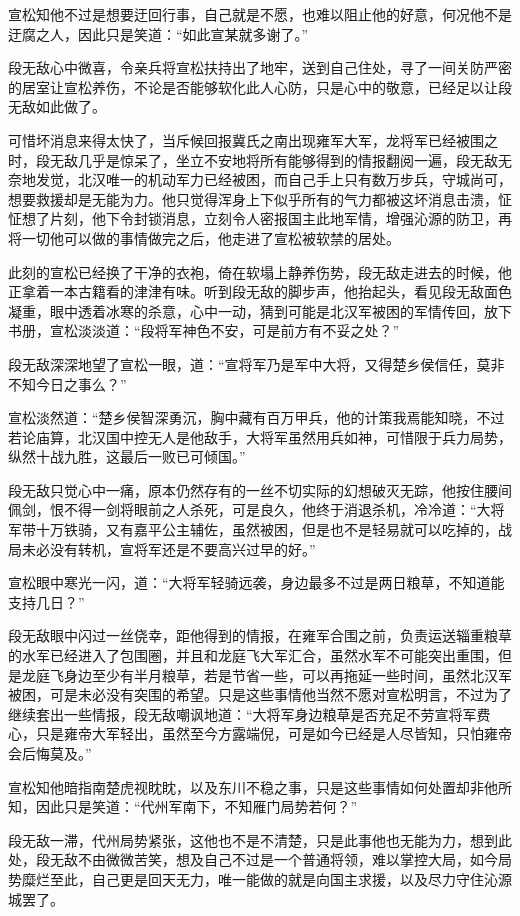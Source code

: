 宣松知他不过是想要迂回行事，自己就是不愿，也难以阻止他的好意，何况他不是迂腐之人，因此只是笑道：“如此宣某就多谢了。”

段无敌心中微喜，令亲兵将宣松扶持出了地牢，送到自己住处，寻了一间关防严密的居室让宣松养伤，不论是否能够软化此人心防，只是心中的敬意，已经足以让段无敌如此做了。

可惜坏消息来得太快了，当斥候回报冀氏之南出现雍军大军，龙将军已经被围之时，段无敌几乎是惊呆了，坐立不安地将所有能够得到的情报翻阅一遍，段无敌无奈地发觉，北汉唯一的机动军力已经被困，而自己手上只有数万步兵，守城尚可，想要救援却是无能为力。他只觉得浑身上下似乎所有的气力都被这坏消息击溃，怔怔想了片刻，他下令封锁消息，立刻令人密报国主此地军情，增强沁源的防卫，再将一切他可以做的事情做完之后，他走进了宣松被软禁的居处。

此刻的宣松已经换了干净的衣袍，倚在软塌上静养伤势，段无敌走进去的时候，他正拿着一本古籍看的津津有味。听到段无敌的脚步声，他抬起头，看见段无敌面色凝重，眼中透着冰寒的杀意，心中一动，猜到可能是北汉军被困的军情传回，放下书册，宣松淡淡道：“段将军神色不安，可是前方有不妥之处？”

段无敌深深地望了宣松一眼，道：“宣将军乃是军中大将，又得楚乡侯信任，莫非不知今日之事么？”

宣松淡然道：“楚乡侯智深勇沉，胸中藏有百万甲兵，他的计策我焉能知晓，不过若论庙算，北汉国中控无人是他敌手，大将军虽然用兵如神，可惜限于兵力局势，纵然十战九胜，这最后一败已可倾国。”

段无敌只觉心中一痛，原本仍然存有的一丝不切实际的幻想破灭无踪，他按住腰间佩剑，恨不得一剑将眼前之人杀死，可是良久，他终于消退杀机，冷冷道：“大将军带十万铁骑，又有嘉平公主辅佐，虽然被困，但是也不是轻易就可以吃掉的，战局未必没有转机，宣将军还是不要高兴过早的好。”

宣松眼中寒光一闪，道：“大将军轻骑远袭，身边最多不过是两日粮草，不知道能支持几日？”

段无敌眼中闪过一丝侥幸，距他得到的情报，在雍军合围之前，负责运送辎重粮草的水军已经进入了包围圈，并且和龙庭飞大军汇合，虽然水军不可能突出重围，但是龙庭飞身边至少有半月粮草，若是节省一些，可以再拖延一些时间，虽然北汉军被困，可是未必没有突围的希望。只是这些事情他当然不愿对宣松明言，不过为了继续套出一些情报，段无敌嘲讽地道：“大将军身边粮草是否充足不劳宣将军费心，只是雍帝大军轻出，虽然至今方露端倪，可是如今已经是人尽皆知，只怕雍帝会后悔莫及。”

宣松知他暗指南楚虎视眈眈，以及东川不稳之事，只是这些事情如何处置却非他所知，因此只是笑道：“代州军南下，不知雁门局势若何？”

段无敌一滞，代州局势紧张，这他也不是不清楚，只是此事他也无能为力，想到此处，段无敌不由微微苦笑，想及自己不过是一个普通将领，难以掌控大局，如今局势糜烂至此，自己更是回天无力，唯一能做的就是向国主求援，以及尽力守住沁源城罢了。

